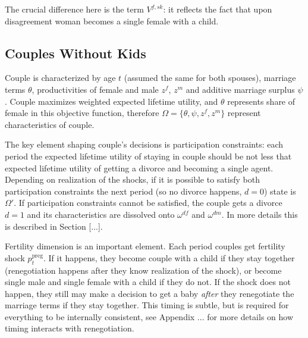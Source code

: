 \documentclass[12pt,letter]{article}
\begin{document}
% 
The crucial difference here is the term $V^{f,sk}$: it reflects the fact that upon disagreement woman becomes a single female with a child. 

\subsection{Couples Without Kids}
Couple is characterized by age $t$ (assumed the same for both spouses), marriage terms $\theta$, productivities of female and male $z^f$, $z^m$ and additive marriage surplus $\psi$. Couple maximizes weighted expected lifetime utility, and $\theta$ represents share of female in this objective function, therefore $\Omega = \{\theta,\psi,z^f,z^m\}$ represent characteristics of couple.

The key element shaping couple's decisions is participation constraints: each period the expected lifetime utility of staying in couple should be not less that expected lifetime utility of getting a divorce and becoming a single agent. Depending on realization of the shocks, if it is possible to satisfy both participation constraints the next period (so no divorce happens, $d = 0$) state is $\Omega'$. If participation constraints cannot be satisfied, the couple gets a divorce $d = 1$ and its characteristics are dissolved onto $\omega^{df}$ and $\omega^{dm}$.  In more details this is described in Section [...].

Fertility dimension is an important element. Each period couples get fertility shock $p^{\text{preg}}_t$. If it happens, they become couple with a child if they stay together (renegotiation happens after they know realization of the shock), or become single male and single female with a child if they do not. If the shock does not happen, they still may make a decision to get a baby \emph{after} they renegotiate the marriage terms if they stay together. This timing is subtle, but is required for everything to be internally consistent, see Appendix ... for more details on how timing interacts with renegotiation. 
\end{document}
